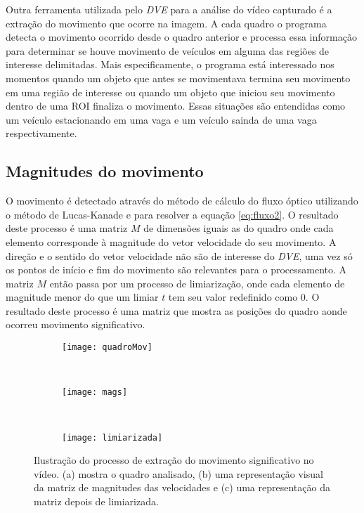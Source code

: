 Outra ferramenta utilizada pelo \textit{DVE} para a análise do vídeo capturado é a extração do movimento que ocorre na imagem. A cada quadro o programa detecta o movimento ocorrido desde o quadro anterior e processa essa informação para determinar se houve movimento de veículos em alguma das regiões de interesse delimitadas. Mais especificamente, o programa está interessado nos momentos quando um objeto que antes se movimentava termina seu movimento em uma região de interesse ou quando um objeto que iniciou seu movimento dentro de uma ROI finaliza o movimento. Essas situações são entendidas como um veículo estacionando em uma vaga e um veículo sainda de uma vaga respectivamente.

\subsection{Magnitudes do movimento}

O movimento é detectado através do método de cálculo do fluxo óptico utilizando o método de Lucas-Kanade\cite{faria1992fluxo}\cite{mota2011tensor} e \cite{bruhn2005lucas} para resolver a equação \ref{eq:fluxo2}. O resultado deste processo é uma matriz $M$ de dimensões iguais as do quadro onde cada elemento corresponde à magnitude do vetor velocidade do seu movimento. A direção e o sentido do vetor velocidade não são de interesse do \textit{DVE}, uma vez só os pontos de início e fim do movimento são relevantes para o processamento. A matriz $M$ então passa por um processo de limiarização, onde cada elemento de magnitude menor do que um limiar $t$ tem seu valor redefinido como $0$. O resultado deste processo é uma matriz que mostra as posições do quadro aonde ocorreu movimento significativo. 



\begin{figure}
\centering
\begin{subfigure}{.5\textwidth}
  \centering
  \texttt{[image: quadroMov]}
  \caption{}
  \label{fig:ilustraMovimento:sub:quadro}
\end{subfigure}\\
\begin{subfigure}{.5\textwidth}
  \centering
  \texttt{[image: mags]}
  \caption{}
  \label{fig:ilustraMovimento:sub:mags}
\end{subfigure}\\
\begin{subfigure}{.5\textwidth}
  \centering
  \texttt{[image: limiarizada]}
  \caption{}
  \label{fig:ilustraMovimento:sub:limiarizada}
\end{subfigure}
\centering
\caption{Ilustração do processo de extração do movimento significativo no vídeo. (a) mostra o quadro analisado, (b) uma representação visual da matriz de magnitudes das velocidades e (c) uma representação da matriz depois de limiarizada.}
\label{fig:ilustraMovimento}
\end{figure}


